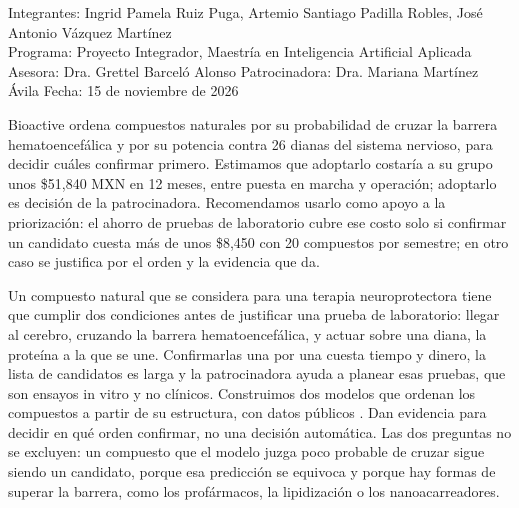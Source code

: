 \documentclass[letterpaper,11pt]{article}
\begin{document}
\thispagestyle{primera}

\smallskip
\noindent{\large\textcolor{black!60}{Resumen ejecutivo: priorizar compuestos naturales con potencial neuroprotector}\par}
\medskip

\noindent\begingroup\setlength{\fboxsep}{7pt}%
\colorbox{black!8}{\parbox{\dimexpr\linewidth-2\fboxsep\relax}{\small{}%
\textcolor{black!60}{Integrantes:} Ingrid Pamela Ruiz Puga, Artemio Santiago Padilla Robles, José Antonio Vázquez Martínez\\
\textcolor{black!60}{Programa:} Proyecto Integrador, Maestría en Inteligencia Artificial Aplicada\\
\textcolor{black!60}{Asesora:} Dra. Grettel Barceló Alonso \quad \textcolor{black!60}{Patrocinadora:} Dra. Mariana Martínez Ávila \quad \textcolor{black!60}{Fecha:} 15 de noviembre de 2026}}%
\endgroup\par\medskip

Bioactive ordena compuestos naturales por su probabilidad de cruzar la barrera hematoencefálica y por su potencia contra 26 dianas del sistema nervioso, para decidir cuáles confirmar primero. Estimamos que adoptarlo costaría a su grupo unos \$51,840 MXN en 12 meses, entre puesta en marcha y operación; adoptarlo es decisión de la patrocinadora. Recomendamos usarlo como apoyo a la priorización: el ahorro de pruebas de laboratorio cubre ese costo solo si confirmar un candidato cuesta más de unos \$8,450 con 20 compuestos por semestre; en otro caso se justifica por el orden y la evidencia que da.

Un compuesto natural que se considera para una terapia neuroprotectora tiene que cumplir dos condiciones antes de justificar una prueba de laboratorio: llegar al cerebro, cruzando la barrera hematoencefálica, y actuar sobre una diana, la proteína a la que se une. Confirmarlas una por una cuesta tiempo y dinero, la lista de candidatos es larga y la patrocinadora ayuda a planear esas pruebas, que son ensayos in vitro y no clínicos. Construimos dos modelos que ordenan los compuestos a partir de su estructura, con datos públicos \parencite{meng2021b3db,zdrazil2024chembl,zhao2023npass}. Dan evidencia para decidir en qué orden confirmar, no una decisión automática. Las dos preguntas no se excluyen: un compuesto que el modelo juzga poco probable de cruzar sigue siendo un candidato, porque esa predicción se equivoca y porque hay formas de superar la barrera, como los profármacos, la lipidización o los nanoacarreadores.
\end{document}
